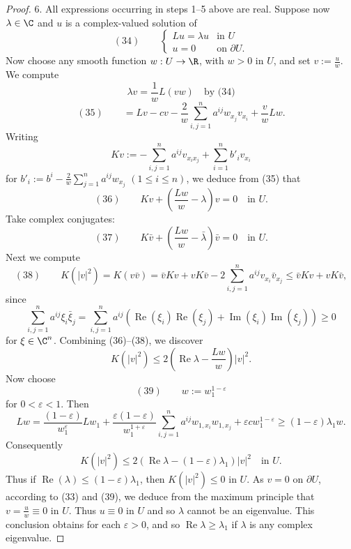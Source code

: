 \begin{proof}
6. All expressions occurring in steps 1--5 above are real. Suppose now $\lambda \in \C$ and $u$ is a complex-valued solution of
$$(34) \qquad \begin{cases} Lu = \lambda u & \text{in } U \\ u = 0 & \text{on } \partial U. \end{cases}$$
Now choose any smooth function $w : U \to \R$, with $w > 0$ in $U$, and set $v := \frac uw$. We compute
$$\lambda v = \frac1wL(vw) \quad \text{by (34)}$$
$$(35) \qquad = Lv - cv - \frac2w\sum_{i,j=1}^n a^{ij}w_{x_j}v_{x_i} + \frac vwLw.$$
Writing
$$Kv := -\sum_{i,j=1}^n a^{ij}v_{x_ix_j} + \sum_{i=1}^n b'_iv_{x_i}$$
for $b'_i := b^i - \frac2w\sum_{j=1}^n a^{ij}w_{x_j}$ $(1 \leq i \leq n)$, we deduce from (35) that
$$(36) \qquad Kv + \left(\frac{Lw}w - \lambda\right)v = 0 \quad \text{in } U.$$
Take complex conjugates:
$$(37) \qquad K\bar v + \left(\frac{Lw}w - \bar\lambda\right)\bar v = 0 \quad \text{in } U.$$
Next we compute
$$(38) \qquad K(|v|^2) = K(v\bar v) = \bar vKv + vK\bar v - 2\sum_{i,j=1}^n a^{ij}v_{x_i}\bar v_{x_j} \leq \bar vKv + vK\bar v,$$
since
$$\sum_{i,j=1}^n a^{ij}\xi_i\bar\xi_j = \sum_{i,j=1}^n a^{ij}(\operatorname{Re}(\xi_i)\operatorname{Re}(\xi_j) + \operatorname{Im}(\xi_i)\operatorname{Im}(\xi_j)) \geq 0$$
for $\xi \in \C^n$. Combining (36)--(38), we discover
$$K(|v|^2) \leq 2\left(\operatorname{Re}\lambda - \frac{Lw}w\right)|v|^2.$$
Now choose
$$(39) \qquad w := w_1^{1-\varepsilon}$$
for $0 < \varepsilon < 1$. Then
$$Lw = \frac{(1-\varepsilon)}{w_1^\varepsilon}Lw_1 + \frac{\varepsilon(1-\varepsilon)}{w_1^{1+\varepsilon}}\sum_{i,j=1}^n a^{ij}w_{1,x_i}w_{1,x_j} + \varepsilon cw_1^{1-\varepsilon} \geq (1-\varepsilon)\lambda_1w.$$
Consequently
$$K(|v|^2) \leq 2(\operatorname{Re}\lambda - (1-\varepsilon)\lambda_1)|v|^2 \quad \text{in } U.$$
Thus if $\operatorname{Re}(\lambda) \leq (1-\varepsilon)\lambda_1$, then $K(|v|^2) \leq 0$ in $U$. As $v = 0$ on $\partial U$, according to (33) and (39), we deduce from the maximum principle that $v = \frac uw \equiv 0$ in $U$. Thus $u \equiv 0$ in $U$ and so $\lambda$ cannot be an eigenvalue. This conclusion obtains for each $\varepsilon > 0$, and so $\operatorname{Re}\lambda \geq \lambda_1$ if $\lambda$ is any complex eigenvalue.


\end{proof}
